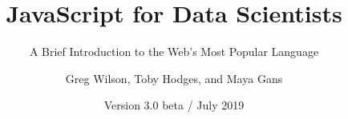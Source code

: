 \documentclass[nemilov1]{Nemilov}
\begin{document}
\title{JavaScript for Data Scientists}
\subtitle{A Brief Introduction to the Web's Most Popular Language}
\author{Greg Wilson, Toby Hodges, and Maya Gans}
\date{Version 3.0 beta / July 2019}
\maketitle

\frontmatter

\tableofcontents

\mainmatter
















\cleardoublepage

\printbibliography

\appendix













\end{document}
